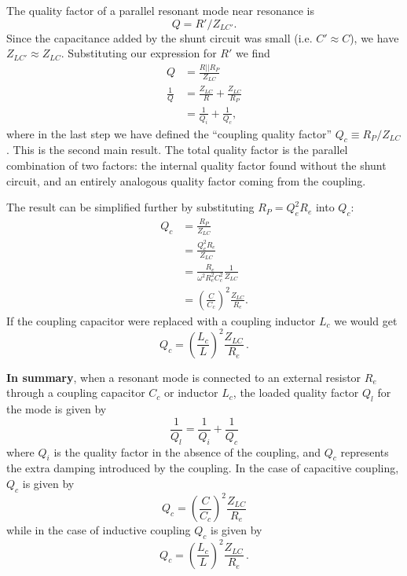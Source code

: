 The quality factor of a parallel resonant mode near resonance is \begin{equation}
Q = R' / Z_{LC'} . \end{equation}
Since the capacitance added by the shunt circuit was small (i.e. $C' \approx C$), we have $Z_{LC'} \approx Z_{LC}$.
Substituting our expression for $R'$ we find \begin{align}
Q &= \frac{R||R_P}{Z_{LC}} \\
\frac{1}{Q} &= \frac{Z_{LC}}{R} + \frac{Z_{LC}}{R_P} \\
&= \frac{1}{Q_i} + \frac{1}{Q_c}, \end{align}
where in the last step we have defined the ``coupling quality factor'' $Q_c \equiv R_P / Z_{LC}$.
This is the second main result.
The total quality factor is the parallel combination of two factors: the internal quality factor found without the shunt circuit, and an entirely analogous quality factor coming from the coupling.

The result can be simplified further by substituting $R_P = Q_e^2 R_e$ into $Q_c$:
\begin{align}
Q_c &= \frac{R_P}{Z_{LC}} \nonumber \\
&= \frac{Q_e^2 R_e}{Z_{LC}} \nonumber \\
&= \frac{R_e}{\omega^2 R_e^2 C_c^2} \frac{1}{Z_{LC}} \nonumber \\
&= \left( \frac{C}{C_c} \right)^2 \frac{Z_{LC}}{R_e} .
\end{align}
If the coupling capacitor were replaced with a coupling inductor $L_c$ we would get \begin{equation}
Q_c = \left( \frac{L_c}{L} \right)^2 \frac{Z_{LC}}{R_e} \, . \end{equation}

\textbf{In summary}, when a resonant mode is connected to an external resistor $R_e$ through a coupling capacitor $C_c$ or inductor $L_c$, the loaded quality factor $Q_l$ for the mode is given by \begin{equation}
\frac{1}{Q_l} = \frac{1}{Q_i} + \frac{1}{Q_c} \end{equation}
where $Q_i$ is the quality factor in the absence of the coupling, and $Q_c$ represents the extra damping introduced by the coupling.
In the case of capacitive coupling, $Q_c$ is given by \begin{equation}
Q_c = \left( \frac{C}{C_c} \right)^2 \frac{Z_{LC}}{R_e} \end{equation}
while in the case of inductive coupling $Q_c$ is given by \begin{equation}
Q_c = \left( \frac{L_c}{L} \right)^2 \frac{Z_{LC}}{R_e} \, . \end{equation}
